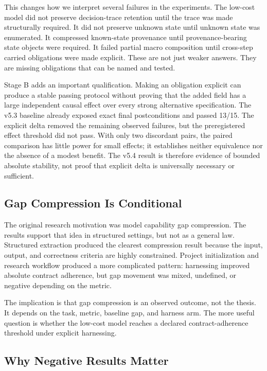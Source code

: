 \documentclass[11pt]{article}
\begin{document}
This changes how we interpret several failures in the experiments. The low-cost model did not preserve decision-trace retention until the trace was made structurally required. It did not preserve unknown state until unknown state was enumerated. It compressed known-state provenance until provenance-bearing state objects were required. It failed partial macro composition until cross-step carried obligations were made explicit. These are not just weaker answers. They are missing obligations that can be named and tested.

Stage B adds an important qualification. Making an obligation explicit can produce a stable passing protocol without proving that the added field has a large independent causal effect over every strong alternative specification. The v5.3 baseline already exposed exact final postconditions and passed 13/15. The explicit delta removed the remaining observed failures, but the preregistered effect threshold did not pass. With only two discordant pairs, the paired comparison has little power for small effects; it establishes neither equivalence nor the absence of a modest benefit. The v5.4 result is therefore evidence of bounded absolute stability, not proof that explicit delta is universally necessary or sufficient.

\subsection{Gap Compression Is Conditional}

The original research motivation was model capability gap compression. The results support that idea in structured settings, but not as a general law. Structured extraction produced the clearest compression result because the input, output, and correctness criteria are highly constrained. Project initialization and research workflow produced a more complicated pattern: harnessing improved absolute contract adherence, but gap movement was mixed, undefined, or negative depending on the metric.

The implication is that gap compression is an observed outcome, not the thesis. It depends on the task, metric, baseline gap, and harness arm. The more useful question is whether the low-cost model reaches a declared contract-adherence threshold under explicit harnessing.

\subsection{Why Negative Results Matter}
\end{document}
